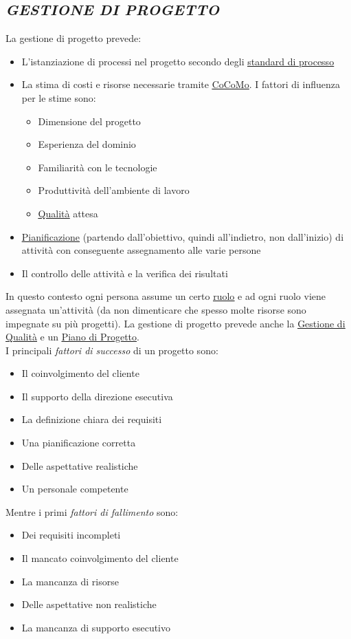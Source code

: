 		\subsection{\emph{GESTIONE DI PROGETTO}}  \label{gestioneprogetto}	%
		La gestione di progetto prevede:
			\begin{itemize}
				\item L'istanziazione di processi nel progetto secondo degli \underline{\hyperref[standard]{standard di processo}}
				\item La stima di costi e risorse necessarie tramite \underline{\hyperref[cocomo]{CoCoMo}}. I fattori di influenza per le stime sono:
				\begin{itemize}
					\item Dimensione del progetto
					\item Esperienza del dominio
					\item Familiarità con le tecnologie
					\item Produttività dell'ambiente di lavoro
					\item \underline{\hyperref[qualita]{Qualità}} attesa
				\end{itemize}
				\item \underline{\hyperref[pianificazione]{Pianificazione}} (partendo dall'obiettivo, quindi all'indietro, non dall'inizio) di attività con conseguente assegnamento alle varie persone
				\item Il controllo delle attività e la verifica dei risultati
			\end{itemize}
		In questo contesto ogni persona assume un certo \underline{\hyperref[ruoli]{ruolo}} e ad ogni ruolo viene assegnata un'attività (da non dimenticare che spesso molte risorse sono impegnate su più progetti). La gestione di progetto prevede anche la  \underline{\hyperref[gestionequalita]{Gestione di Qualità}} e un \underline{\hyperref[piano]{Piano di Progetto}}. \\
		I principali \textit{fattori di successo} di un progetto sono:
		\begin{itemize}
			\item Il coinvolgimento del cliente
			\item Il supporto della direzione esecutiva
			\item La definizione chiara dei requisiti
			\item Una pianificazione corretta
			\item Delle aspettative realistiche
			\item Un personale competente
		\end{itemize}
		Mentre i primi \textit{fattori di fallimento} sono:
		\begin{itemize}
			\item Dei requisiti incompleti
			\item Il mancato coinvolgimento del cliente
			\item La mancanza di risorse
			\item Delle aspettative non realistiche
			\item La mancanza di supporto  esecutivo
		\end{itemize}

